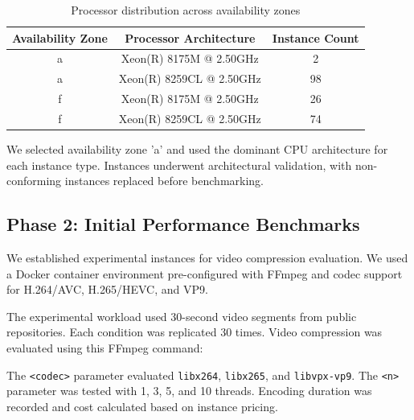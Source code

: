 \documentclass[conference]{IEEEtran}
\begin{document}
	\begin{table}[H]
		\centering
		\caption{Processor distribution across availability zones}
		\label{tab:processors}
		\begin{tabular}{|c|c|c|}
			\hline
			Availability Zone & Processor Architecture & Instance Count \\ \hline
			a & Xeon(R) 8175M @ 2.50GHz & 2 \\ \hline
			a & Xeon(R) 8259CL @ 2.50GHz & 98 \\ \hline
			f & Xeon(R) 8175M @ 2.50GHz & 26 \\ \hline
			f & Xeon(R) 8259CL @ 2.50GHz & 74 \\ \hline
		\end{tabular}
	\end{table}
	
	We selected availability zone 'a' and used the dominant CPU architecture for each instance type. Instances underwent architectural validation, with non-conforming instances replaced before benchmarking.
	
	\subsection{Phase 2: Initial Performance Benchmarks}
	\label{execution-initial-performance-benchmarks}
	
	We established experimental instances for video compression evaluation. We used a Docker container environment pre-configured with FFmpeg and codec support for H.264/AVC, H.265/HEVC, and VP9.
	
	The experimental workload used 30-second video segments from public repositories. Each condition was replicated 30 times. Video compression was evaluated using this FFmpeg command:
	
	\begin{center}
		{\ttfamily\scriptsize
		}
	\end{center}
	
	The \texttt{<codec>} parameter evaluated \texttt{libx264}, \texttt{libx265}, and \texttt{libvpx-vp9}. The \texttt{<n>} parameter was tested with 1, 3, 5, and 10 threads. Encoding duration was recorded and cost calculated based on instance pricing.
	
\end{document}
